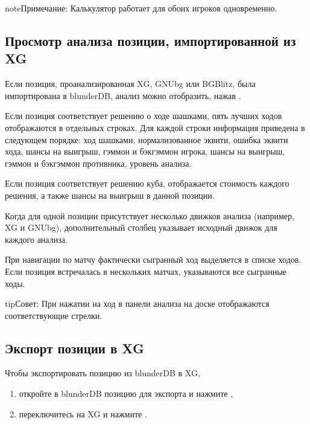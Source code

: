 \documentclass[letterpaper,10pt,russian]{sphinxmanual}
\begin{document}
\begin{sphinxadmonition}{note}{Примечание:}
\sphinxAtStartPar
Калькулятор работает для обоих игроков одновременно.
\end{sphinxadmonition}


\subsection{Просмотр анализа позиции, импортированной из XG}
\label{\detokenize{guide_utilisateur:afficher-l-analyse-d-une-position-importee-depuis-xg}}
\sphinxAtStartPar
Если позиция, проанализированная XG, GNUbg или BGBlitz, была импортирована в blunderDB, анализ можно отобразить, нажав .

\sphinxAtStartPar
Если позиция соответствует решению о ходе шашками, пять лучших ходов отображаются в отдельных строках. Для каждой строки информация приведена в следующем порядке: ход шашками, нормализованное эквити, ошибка эквити хода, шансы на выигрыш, гэммон и бэкгэммон игрока, шансы на выигрыш, гэммон и бэкгэммон противника, уровень анализа.

\sphinxAtStartPar
Если позиция соответствует решению куба, отображается стоимость каждого решения, а также шансы на выигрыш в данной позиции.

\sphinxAtStartPar
Когда для одной позиции присутствует несколько движков анализа (например, XG и GNUbg), дополнительный столбец указывает исходный движок для каждого анализа.

\sphinxAtStartPar
При навигации по матчу фактически сыгранный ход выделяется в списке ходов. Если позиция встречалась в нескольких матчах, указываются все сыгранные ходы.

\begin{sphinxadmonition}{tip}{Совет:}
\sphinxAtStartPar
При нажатии на ход в панели анализа на доске отображаются соответствующие стрелки.
\end{sphinxadmonition}


\subsection{Экспорт позиции в XG}
\label{\detokenize{guide_utilisateur:exporter-une-position-vers-xg}}
\sphinxAtStartPar
Чтобы экспортировать позицию из blunderDB в XG,
\begin{enumerate}
%
\item {} 
\sphinxAtStartPar
откройте в blunderDB позицию для экспорта и нажмите ,

\item {} 
\sphinxAtStartPar
переключитесь на XG и нажмите .

\end{enumerate}
\end{document}
